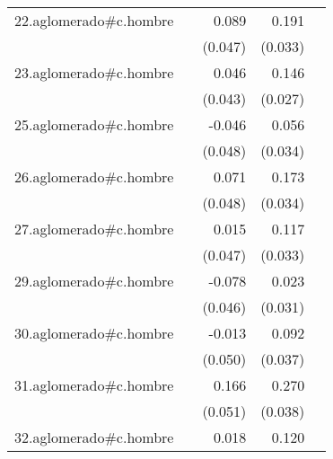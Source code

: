 {\begin{longtable}{l*{4}{D{.}{.}{-1}}}
\addlinespace
22.aglomerado#c.hombre&                     &       0.089         &       0.191\sym{***}&                     \\
            &                     &     (0.047)         &     (0.033)         &                     \\
\addlinespace
23.aglomerado#c.hombre&                     &       0.046         &       0.146\sym{***}&                     \\
            &                     &     (0.043)         &     (0.027)         &                     \\
\addlinespace
25.aglomerado#c.hombre&                     &      -0.046         &       0.056         &                     \\
            &                     &     (0.048)         &     (0.034)         &                     \\
\addlinespace
26.aglomerado#c.hombre&                     &       0.071         &       0.173\sym{***}&                     \\
            &                     &     (0.048)         &     (0.034)         &                     \\
\addlinespace
27.aglomerado#c.hombre&                     &       0.015         &       0.117\sym{***}&                     \\
            &                     &     (0.047)         &     (0.033)         &                     \\
\addlinespace
29.aglomerado#c.hombre&                     &      -0.078         &       0.023         &                     \\
            &                     &     (0.046)         &     (0.031)         &                     \\
\addlinespace
30.aglomerado#c.hombre&                     &      -0.013         &       0.092\sym{*}  &                     \\
            &                     &     (0.050)         &     (0.037)         &                     \\
\addlinespace
31.aglomerado#c.hombre&                     &       0.166\sym{**} &       0.270\sym{***}&                     \\
            &                     &     (0.051)         &     (0.038)         &                     \\
\addlinespace
32.aglomerado#c.hombre&                     &       0.018         &       0.120\sym{***}&                     \\

\end{longtable}}
